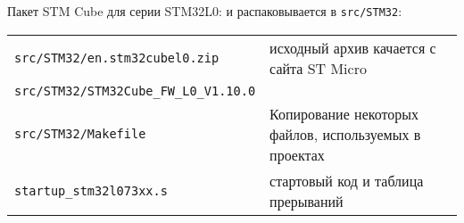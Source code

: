\pagebreak
{}\secdown


Пакет STM Cube для серии STM32L0:  и распаковывается в
\verb|src/STM32|:\bigskip

\begin{tabular}{l l}
\verb|src/STM32/en.stm32cubel0.zip| & исходный архив качается с сайта ST Micro\\
\verb|src/STM32/STM32Cube_FW_L0_V1.10.0| & \\
\verb|src/STM32/Makefile| & Копирование некоторых файлов, используемых в
проектах\\
\hline
\verb|startup_stm32l073xx.s| & стартовый код и таблица прерываний \\
\end{tabular}



\secup

